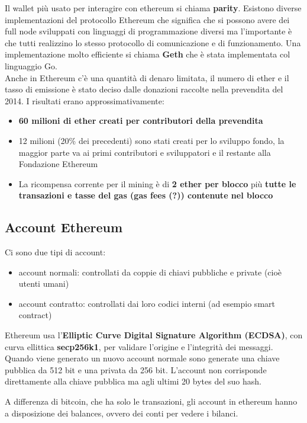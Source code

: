Il wallet più usato per interagire con ethereum si chiama \textbf{parity}. Esistono diverse implementazioni del protocollo Ethereum che significa che si possono avere dei full node sviluppati con linguaggi di programmazione diversi ma l'importante è che tutti realizzino lo stesso protocollo di comunicazione e di funzionamento. Una implementazione molto efficiente si chiama \textbf{Geth} che è stata implementata col linguaggio Go.\\

Anche in Ethereum c'è una quantità di denaro limitata, il numero di ether e il tasso di emissione è stato deciso dalle donazioni raccolte nella prevendita del 2014. I risultati erano approssimativamente:
\begin{itemize}
    \item \textbf{60 milioni di ether creati per contributori della prevendita}
    \item 12 milioni (20\% dei precedenti) sono stati creati per lo sviluppo fondo, la maggior parte va ai primi contributori e sviluppatori e il restante alla Fondazione Ethereum
    \item La ricompensa corrente per il mining è di \textbf{2 ether per blocco} più \textbf{tutte le transazioni e tasse del gas (gas fees (?)) contenute nel blocco}
\end{itemize}

\subsection{Account Ethereum}
Ci sono due tipi di account:
\begin{itemize}
    \item account normali: controllati da coppie di chiavi pubbliche e private (cioè utenti umani)
    \item account contratto: controllati dai loro codici interni (ad esempio smart contract)
\end{itemize}
Ethereum usa l'\textbf{Elliptic Curve Digital Signature Algorithm (ECDSA)}, con curva ellittica \textbf{secp256k1}, per validare l'origine e l'integrità dei messaggi. Quando viene generato un nuovo account normale sono generate una chiave pubblica da 512 bit e una privata da 256 bit. L'account non corrisponde direttamente alla chiave pubblica ma agli ultimi 20 bytes del suo hash.

A differenza di bitcoin, che ha solo le transazioni, gli account in ethereum hanno a disposizione dei balances, ovvero dei conti per vedere i bilanci. 

